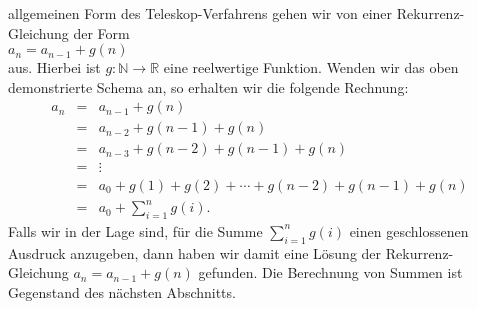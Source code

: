 allgemeinen Form des Teleskop-Verfahrens gehen wir von einer Rekurrenz-Gleichung der Form
\\[0.2cm]
\hspace*{1.3cm}
$a_n = a_{n-1} + g(n)$
\\[0.2cm]
aus.  Hierbei ist $g: \mathbb{N} \rightarrow \mathbb{R}$ eine reelwertige Funktion.
Wenden wir das oben demonstrierte Schema an, so erhalten wir die folgende Rechnung:
\[ 
\begin{array}{lcl}  
  a_n & = & a_{n-1} + g(n) \\
      & = & a_{n-2} + g(n-1) + g(n) \\
      & = & a_{n-3} + g(n-2) + g(n-1) + g(n) \\
      & = & \vdots \\
      & = & a_{0} + g(1) + g(2) + \cdots  + g(n-2) + g(n-1) + g(n) \\[0.2cm]
      & = & a_0 + \sum\limits_{i=1}^{n} g(i).
\end{array}
\]
Falls wir in der Lage sind, für die Summe $\sum_{i=1}^{n} g(i)$ einen geschlossenen Ausdruck anzugeben,
dann haben wir damit eine Lösung der Rekurrenz-Gleichung $a_n = a_{n-1} + g(n)$
gefunden.  Die Berechnung von Summen ist Gegenstand des nächsten Abschnitts.

